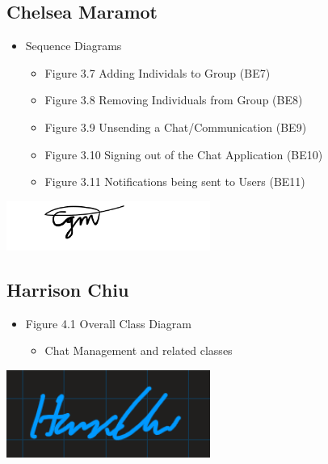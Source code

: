 \documentclass[]{article}
\begin{document}
\subsection{Chelsea Maramot}
\label{subsec:chelsea_maramot}
\begin{itemize}
	\item Sequence Diagrams
	      \begin{itemize}
		      \item Figure 3.7 Adding Individals to Group (BE7)
		      \item Figure 3.8 Removing Individuals from Group (BE8)
		      \item Figure 3.9 Unsending a Chat/Communication (BE9)
		      \item Figure 3.10 Signing out of the Chat Application (BE10)
		      \item Figure 3.11 Notifications being sent to Users (BE11)
	      \end{itemize}
\end{itemize}
\includegraphics[width=0.5\textwidth]{chelsea.png}

\subsection{Harrison Chiu}
\label{subsec:harrison_chiu}
\begin{itemize}
	\item Figure 4.1 Overall Class Diagram
	      \begin{itemize}
		      \item Chat Management and related classes
	      \end{itemize}
\end{itemize}
\includegraphics[width=0.5\textwidth]{harrison.png}
\end{document}
